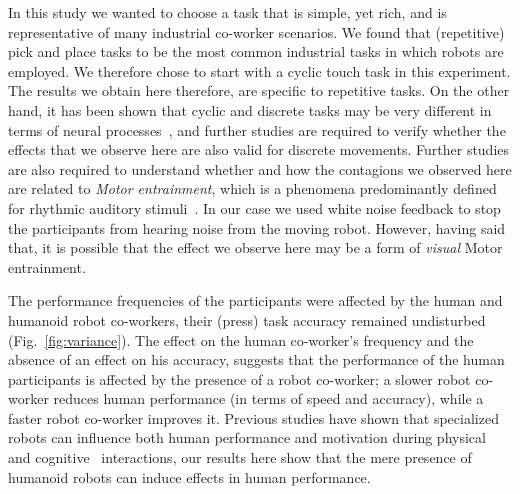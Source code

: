 \documentclass[a4paper, 12pt, oneside]{Thesis}  %
\begin{document}
In this study we wanted to choose a task that is simple, yet rich, and is representative of many industrial co-worker scenarios. We found that (repetitive) pick and place tasks to be the most common industrial tasks in which robots are employed. We therefore chose to start with a cyclic touch task in this experiment. The results we obtain here therefore, are specific to repetitive tasks. On the other hand, it has been shown that cyclic and discrete tasks may be very different in terms of neural processes~\cite{Schaal:Nature:2004}, and further studies are required to verify whether the effects that we observe here are also valid for discrete movements. Further studies are also required to understand whether and how the contagions we observed here are related to \textit{Motor entrainment}, which is a phenomena predominantly defined for rhythmic auditory stimuli~\cite{Tierney:Frontiers:2014,Schachner:Elsevier:2009}. In our case we used white noise feedback to stop the participants from hearing noise from the moving robot. However, having said that, it is possible that the effect we observe here may be a form of \textit{visual} Motor entrainment. 

The performance frequencies of the participants were affected by the human and humanoid robot co-workers, their (press) task accuracy remained undisturbed (Fig.~\ref{fig:variance}). The effect on the human co-worker's frequency and the absence of an effect on his accuracy, suggests that the performance of the human participants is affected by the presence of a robot co-worker; a slower robot co-worker reduces human performance (in terms of speed and accuracy), while a faster robot co-worker improves it. Previous studies have shown that specialized robots can influence both human performance and motivation during physical~\cite{Takagi:Nature:2017} and cognitive~\cite{Fasola:ICDL:2010} interactions, our results here show that the mere presence of humanoid robots can induce effects in human performance. 
\end{document}
